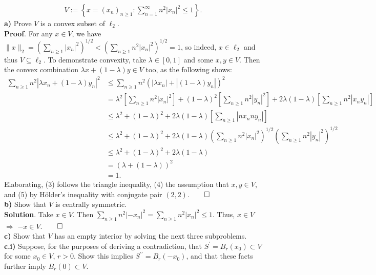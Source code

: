 \documentclass[10pt]{article}
\newcommand{\1}[1]{\mathbbm{1}_{#1}}
\begin{document}
    \begin{align*}
        V:=\left\{x=(x_n)_{n\geq 1}:\sum_{n=1}^\infty n^2|x_n|^2\leq 1\right\}.
    \end{align*}
    {\bf a)} Prove $V$ is a convex subset of $\ell_2$.\\[5pt]
    {\bf Proof}. For any $x\in V$, we have $\|x\|_2=\left(\sum_{n\geq
    1}|x_n|^2\right)^{1/2}<\left(\sum_{n\geq 1}n^2|x_n|^2\right)^{1/2}=1$, so
    indeed, $x\in\ell_2$ and thus $V\subseteq\ell_2$. To demonstrate convexity,
    take $\lambda\in[0,1]$ and some $x,y\in V$. Then the convex combination
    $\lambda x+(1-\lambda)y\in V$ too, as the following shows:
    \begin{align*}
        \sum_{n\geq 1}n^2|\lambda x_n+(1-\lambda)y_n|^2&\leq \sum_{n\geq 1}n^2(|\lambda x_n|+|(1-\lambda)y_n|)^2\tag{3}\\
        &=\lambda^2\left[\sum_{n\geq 1}n^2|x_n|^2\right]+(1-\lambda)^2\left[\sum_{n\geq 1}n^2|y_n|^2\right]+2\lambda(1-\lambda)\left[\sum_{n\geq 1}n^2|x_ny_n|\right]\\
        &\leq\lambda^2+(1-\lambda)^2+2\lambda(1-\lambda)\left[\sum_{n\geq 1}|nx_nny_n|\right]\tag{4}\\ 
        &\leq \lambda^2+(1-\lambda)^2+2\lambda(1-\lambda)\left(\sum_{n\geq 1}n^2|x_n|^2\right)^{1/2}\left(\sum_{n\geq 1}n^2|y_n|^2\right)^{1/2}\tag{5}\\
        &\leq \lambda^2+(1-\lambda)^2+2\lambda(1-\lambda)\\
        &=(\lambda+(1-\lambda))^2\\
        &=1.
    \end{align*}
    Elaborating, (3) follows the triangle inequality, (4) the assumption that
    $x,y\in V$, and (5) by H\"older's inequality with conjugate pair
    $(2,2)$.\hfill{$\qed$}\\[5pt]
    {\bf b)} Show that $V$ is centrally symmetric.\\[5pt]
    {\bf Solution}. Take $x\in V$. Then $\sum_{n\geq 1}n^2|-x_n|^2=\sum_{n\geq
    1}n^2|x_n|^2\leq 1$. Thus, $x\in V$ $\Rightarrow$ $-x\in
    V$.\hfill{$\qed$}\\[5pt]
    {\bf c)} Show that $V$ has an empty interior by solving the next three
    subproblems.\\[5pt]
    {\bf c.i)} Suppose, for the purposes of deriving a contradiction, that
    $S^\prime=B_r(x_0)\subset V$ for some $x_0\in V$, $r>0$. Show this implies
    $S^{\prime\prime}=B_r(-x_0)$, and that these facts further imply
    $B_r(0)\subset V$.\\[5pt]
\end{document}
